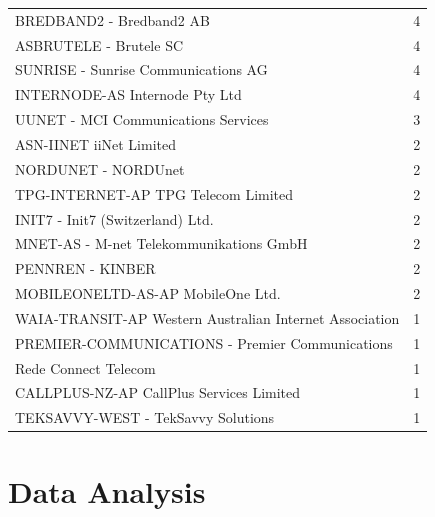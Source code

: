 \begin{table}[!h]
\begin{tabular}{lp{3cm}}
		BREDBAND2 - Bredband2 AB                                 &                          4  \\
		ASBRUTELE - Brutele SC                                   &                          4  \\
		SUNRISE - Sunrise Communications AG                       &                         4  \\
		INTERNODE-AS Internode Pty Ltd                            &                         4  \\
		UUNET - MCI Communications Services                      &                          3  \\
		ASN-IINET iiNet Limited                                   &                         2  \\
		NORDUNET - NORDUnet                                       &                         2  \\
		TPG-INTERNET-AP TPG Telecom Limited                      &                          2  \\
		INIT7 - Init7 (Switzerland) Ltd.                         &                          2  \\
		MNET-AS - M-net Telekommunikations GmbH                   &                         2  \\
		PENNREN - KINBER                                         &                          2  \\
		MOBILEONELTD-AS-AP MobileOne Ltd.    &    2  \\
		WAIA-TRANSIT-AP Western Australian Internet Association           &                 1  \\
		PREMIER-COMMUNICATIONS - Premier Communications                 &                   1  \\
		Rede Connect Telecom                                           &                    1  \\
		CALLPLUS-NZ-AP CallPlus Services Limited                       &                    1  \\
		TEKSAVVY-WEST - TekSavvy Solutions                             &                    1  \\
  		\bottomrule
\end{tabular}
\end{table}

\FloatBarrier

\chapter{Data Analysis}
